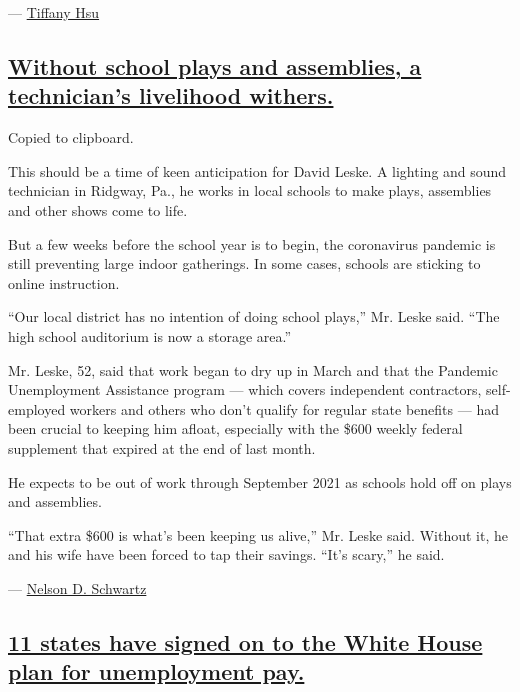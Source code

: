 --- \href{https://www.nytimes3xbfgragh.onion/by/tiffany-hsu}{Tiffany
Hsu}

\hypertarget{without-school-plays-and-assemblies-a-technicians-livelihood-withers}{%
\subsection{\texorpdfstring{\protect\hyperlink{without-school-plays-and-assemblies-a-technicians-livelihood-withers}{Without
school plays and assemblies, a technician's livelihood
withers.}}{Without school plays and assemblies, a technician's livelihood withers.}}\label{without-school-plays-and-assemblies-a-technicians-livelihood-withers}}

Copied to clipboard.

This should be a time of keen anticipation for David Leske. A lighting
and sound technician in Ridgway, Pa., he works in local schools to make
plays, assemblies and other shows come to life.

But a few weeks before the school year is to begin, the coronavirus
pandemic is still preventing large indoor gatherings. In some cases,
schools are sticking to online instruction.

``Our local district has no intention of doing school plays,'' Mr. Leske
said. ``The high school auditorium is now a storage area.''

Mr. Leske, 52, said that work began to dry up in March and that the
Pandemic Unemployment Assistance program --- which covers independent
contractors, self-employed workers and others who don't qualify for
regular state benefits --- had been crucial to keeping him afloat,
especially with the \$600 weekly federal supplement that expired at the
end of last month.

He expects to be out of work through September 2021 as schools hold off
on plays and assemblies.

``That extra \$600 is what's been keeping us alive,'' Mr. Leske said.
Without it, he and his wife have been forced to tap their savings.
``It's scary,'' he said.

---
\href{https://www.nytimes3xbfgragh.onion/by/nelson-d-schwartz}{Nelson D.
Schwartz}

\hypertarget{11-states-have-signed-on-to-the-white-house-plan-for-unemployment-pay}{%
\subsection{\texorpdfstring{\protect\hyperlink{11-states-have-signed-on-to-the-white-house-plan-for-unemployment-pay}{11
states have signed on to the White House plan for unemployment
pay.}}{11 states have signed on to the White House plan for unemployment pay.}}\label{11-states-have-signed-on-to-the-white-house-plan-for-unemployment-pay}}


